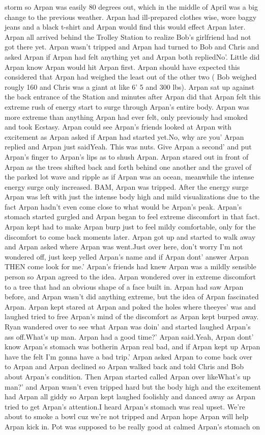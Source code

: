 \documentclass[12pt]{book}
\begin{document}
storm so Arpan was easily 80 degrees out, which in the middle of April was a big change to the previous weather. Arpan had ill-prepared clothes wise, wore baggy jeans and a black t-shirt and Arpan would find this would effect Arpan later. Arpan all arrived behind the Trolley Station to realize Bob's girlfriend had not got there yet. Arpan wasn't tripped and Arpan had turned to Bob and Chris and asked Arpan if Arpan had felt anything yet and Arpan both repliedNo'. Little did Arpan know Arpan would hit Arpan first. Arpan should have expected this considered that Arpan had weighed the least out of the other two ( Bob weighed rougly 160 and Chris was a giant at like 6' 5 and 300 lbs). Arpan sat up against the back entrance of the Station and minutes after Arpan did that Arpan felt this extreme rush of energy start to surge through Arpan's entire body. Arpan was more extreme than anything Arpan had ever felt, only previously had smoked and took Ecstasy. Arpan could see Arpan's friends looked at Arpan with excitement as Arpan asked if Arpan had started yet.No, why are you' Arpan replied and Arpan just saidYeah. This was nuts. Give Arpan a second' and put Arpan's finger to Arpan's lips as to shush Arpan. Arpan stared out in front of Arpan as the trees shifted back and forth behind one another and the gravel of the parked lot wave and ripple as if Arpan was an ocean, meanwhile the intense energy surge only increased. BAM, Arpan was tripped. After the energy surge Arpan was left with just the intense body high and mild visualizations due to the fact Arpan hadn't even come close to what would be Arpan's peak. Arpan's stomach started gurgled and Arpan began to feel extreme discomfort in that fact. Arpan kept had to make Arpan burp just to feel mildy comfortable, only for the discomfort to come back moments later. Arpan got up and started to walk away and Arpan asked where Arpan was went.Just over here, don't worry I'm not wondered off, just keep yelled Arpan's name and if Arpan dont' answer Arpan THEN come look for me.' Arpan's friends had knew Arpan was a mildly sensible person so Arpan agreed to the idea. Arpan wondered over in extreme discomfort to a tree that had an obvious shape of a face built in. Arpan had saw Arpan before, and Arpan wasn't did anything extreme, but the idea of Arpan fascinated Arpan. Arpan kept stared at Arpan and poked the holes where theeyes' was and laughed tried to free Arpan's mind of the discomfort as Arpan kept burped away. Ryan wandered over to see what Arpan was doin' and started laughed Arpan's ass off.What's up man. Arpan had a good time?' Arpan said.Yeah, Arpan dont' know Arpan's stomach was botherin Arpan real bad, and if Arpan kept up Arpan have the felt I'm gonna have a bad trip.' Arpan asked Arpan to come back over to Arpan and Arpan declined so Arpan walked back and told Chris and Bob about Arpan's condition. Then Arpan started called Arpan over likeWhat's up man?' and Arpan wasn't even tripped hard but the body high and the excitement had Arpan all giddy so Arpan kept laughed foolishly and danced away as Arpan tried to get Arpan's attention.I heard Arpan's stomach was real upset. We're about to smoke a bowl cuz we're not tripped and Arpan hope Arpan will help Arpan kick in. Pot was supposed to be really good at calmed Arpan's stomach on 
\end{document}
